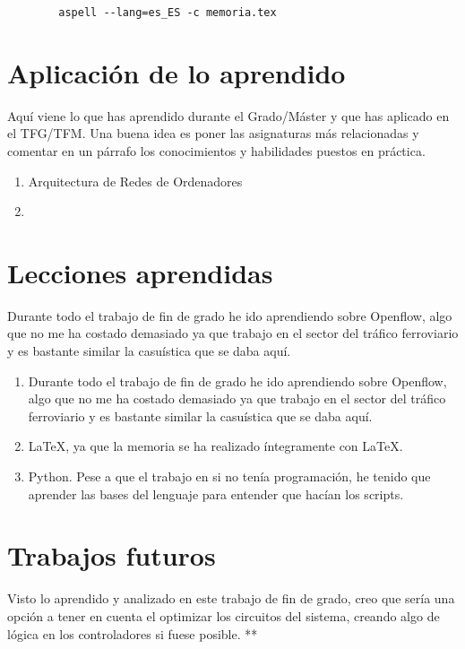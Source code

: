 \documentclass[a4paper, 12pt]{book}
\begin{document}
	\begin{verbatim}
		aspell --lang=es_ES -c memoria.tex
	\end{verbatim}
	
	\section{Aplicación de lo aprendido}
	\label{sec:aplicacion}
	
	Aquí viene lo que has aprendido durante el Grado/Máster y que has aplicado en el TFG/TFM.
	Una buena idea es poner las asignaturas más relacionadas y comentar en un párrafo los conocimientos y habilidades puestos en práctica.
	
	\begin{enumerate}
		\item Arquitectura de Redes de Ordenadores
		\item 
	\end{enumerate}
	
	
	\section{Lecciones aprendidas}
	\label{sec:lecciones_aprendidas}
	
	Durante todo el trabajo de fin de grado he ido aprendiendo sobre Openflow, algo que no me ha costado demasiado ya que trabajo en el sector del tráfico ferroviario y es bastante similar la casuística que se daba aquí.
	
	\begin{enumerate}
		\item Durante todo el trabajo de fin de grado he ido aprendiendo sobre Openflow, algo que no me ha costado demasiado ya que trabajo en el sector del tráfico ferroviario y es bastante similar la casuística que se daba aquí.
		\item LaTeX, ya que la memoria se ha realizado íntegramente con LaTeX.
		\item Python. Pese a que el trabajo en si no tenía programación, he tenido que aprender las bases del lenguaje para entender que hacían los scripts.
	\end{enumerate}
	
	
	\section{Trabajos futuros}
	\label{sec:trabajos_futuros}
	
	Visto lo aprendido y analizado en este trabajo de fin de grado, creo que sería una opción a tener en cuenta el optimizar los circuitos del sistema, creando algo de lógica en los controladores si fuese posible. **
	
\end{document}
